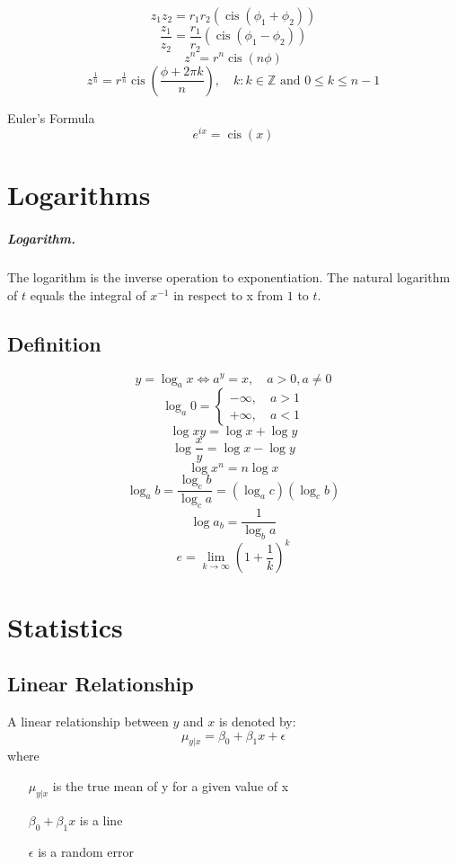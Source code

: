 \documentclass[oneside]{book} %
\theoremstyle{plain}
\DeclareMathOperator\cis{cis} %
\newcommand*\reciprocal[1]{\frac{1}{#1}}
\newcommand*\argument{\phi}
\newcommand*\integers{\mathbb{Z}}
\begin{document}
\[z_1 z_2 = r_1 r_2 \left ( \cis \left ( \phi_1 + \phi_2 \right ) \right )\]
\[\frac{z_1}{z_2} = \frac{r_1}{r_2} \left ( \cis \left ( \phi_1 - \phi_2 \right
) \right )\]
\[z^n = r^n \cis \left ( n \argument \right )\]
\[z^{\reciprocal{n}} = r^{\reciprocal{n}} \cis \left ( \frac{\argument + 2 \pi
k}{n} \right ), \quad
k : k \in \integers \text{ and } 0 \le k \le n - 1\]

Euler's Formula
\[e^{ix} = \cis \left ( x \right)\]


\chapter{Logarithms}

\paragraph{Logarithm.} The logarithm is the inverse operation to exponentiation.
The natural logarithm of \(t\) equals the integral of \(x^{-1}\) in respect to x
from \(1\) to \(t\).

\section{Definition}

\[y = \log_a x \iff a^y = x, \quad a > 0, a \ne 0\]
\[\log_a 0 = \begin{cases} -\infty, \quad a > 1 \\ +\infty, \quad a < 1
\end{cases}\]
\[\log x y = \log x + \log y\]
\[\log \frac{x}{y} = \log x - \log y\]
\[\log x^n = n \log x\]
\[\log_a b = \frac{\log_c b}{\log_c a} = \left ( \log_a c \right ) \left (
\log_c b \right )\]
\[\log a_b = \reciprocal{\log_b a}\]
\[e=\lim_{k\to\infty} \left ( 1 + \reciprocal{k} \right ) ^ k\]


\chapter{Statistics}

\section{Linear Relationship}
A linear relationship between \(y\) and \(x\) is denoted by:
\[\mu_{y | x} = \beta_0 + \beta_1 x + \epsilon\]
where
\begin{itemize}
  \item[\(\mu_{y | x}\)] is the true mean of y for a given value of x
  \item[\(\beta_0 + \beta_1 x\)] is a line
  \item[\(\epsilon\)] is a random error
\end{itemize}
\end{document}
